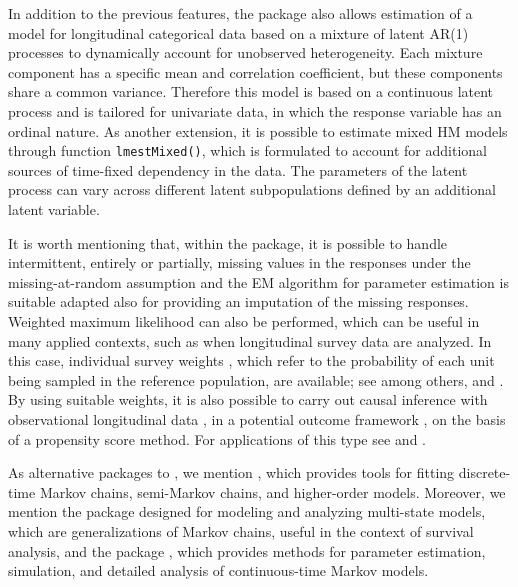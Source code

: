 In addition to the previous features, the  package also
allows estimation of a model for longitudinal categorical data based on
a mixture of latent AR(1) processes to dynamically account for
unobserved heterogeneity. Each mixture component has a specific mean and
correlation coefficient, but these components share a common variance.
Therefore this model is based on a continuous latent process and is
tailored for univariate data, in which the response variable has an
ordinal nature. As another extension, it is possible to estimate mixed
HM models \citep{vand:lang:90} through function \texttt{lmestMixed()}, which is
formulated to account for additional sources of time-fixed dependency in
the data. The parameters of the latent process can vary across different
latent subpopulations defined by an additional latent variable.

It is worth mentioning that, within the package, it is possible to
handle intermittent, entirely or partially, missing values in the
responses under the missing-at-random assumption and the EM algorithm
for parameter estimation is suitable adapted also for providing an
imputation of the missing responses. Weighted maximum likelihood can
also be performed, which can be useful in many applied contexts, such as
when longitudinal survey data are analyzed. In this case, individual
survey weights \citep{kapl:ferg:99}, which refer to the probability of
each unit being sampled in the reference population, are available; see
among others, \cite{pen:gen:20} and \cite{penn:naka:23}. By using
suitable weights, it is also possible to carry out causal inference with
observational longitudinal data \citep{robi:97}, in a potential outcome
framework \citep{rub:74}, on the basis of a propensity score method. For
applications of this type see
\cite{bart:penn:vitt:16, bart:penn:vitt:23} and
\cite{penn:paas:bart:23}.

As alternative packages to , we mention
 \citep{marc:20}, which provides tools for
fitting discrete-time Markov chains, semi-Markov chains, and
higher-order models. Moreover, we mention the  package
\citep{mstate:07} designed for modeling and analyzing multi-state
models, which are generalizations of Markov chains, useful in the
context of survival analysis, and the  package
\citep{ctmc:24}, which provides methods for parameter estimation,
simulation, and detailed analysis of continuous-time Markov models.

